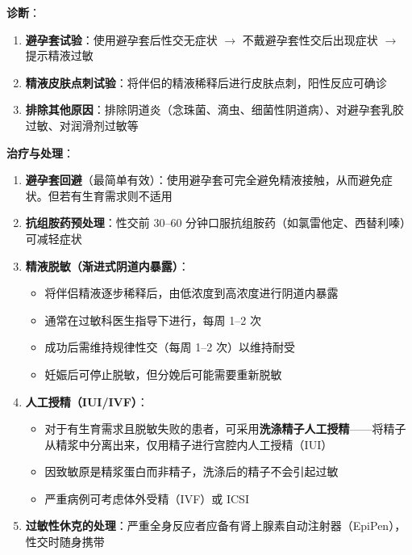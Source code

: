\vspace{0.5em}
\noindent\textbf{诊断}：
\begin{enumerate}
	\item \textbf{避孕套试验}：使用避孕套后性交无症状 $\rightarrow$ 不戴避孕套性交后出现症状 $\rightarrow$ 提示精液过敏
	\item \textbf{精液皮肤点刺试验}：将伴侣的精液稀释后进行皮肤点刺，阳性反应可确诊
	\item \textbf{排除其他原因}：排除阴道炎（念珠菌、滴虫、细菌性阴道病）、对避孕套乳胶过敏、对润滑剂过敏等
\end{enumerate}

\vspace{0.5em}
\noindent\textbf{治疗与处理}：

\begin{enumerate}
	\item \textbf{避孕套回避}（最简单有效）：使用避孕套可完全避免精液接触，从而避免症状。但若有生育需求则不适用

	\item \textbf{抗组胺药预处理}：性交前 30--60 分钟口服抗组胺药（如氯雷他定、西替利嗪）可减轻症状

	\item \textbf{精液脱敏（渐进式阴道内暴露）}：
	\begin{itemize}
		\item 将伴侣精液逐步稀释后，由低浓度到高浓度进行阴道内暴露
		\item 通常在过敏科医生指导下进行，每周 1--2 次
		\item 成功后需维持规律性交（每周 1--2 次）以维持耐受
		\item 妊娠后可停止脱敏，但分娩后可能需要重新脱敏
	\end{itemize}

	\item \textbf{人工授精（IUI/IVF）}：
	\begin{itemize}
		\item 对于有生育需求且脱敏失败的患者，可采用\textbf{洗涤精子人工授精}——将精子从精浆中分离出来，仅用精子进行宫腔内人工授精（IUI）
		\item 因致敏原是精浆蛋白而非精子，洗涤后的精子不会引起过敏
		\item 严重病例可考虑体外受精（IVF）或 ICSI
	\end{itemize}

	\item \textbf{过敏性休克的处理}：严重全身反应者应备有肾上腺素自动注射器（EpiPen），性交时随身携带
\end{enumerate}

